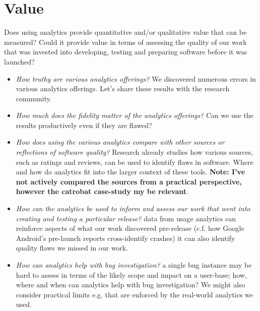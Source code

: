 \section{Value}
Does using analytics provide quantitative and/or qualitative value that can be measured? Could it provide value in terms of assessing the quality of our work that was invested into developing, testing and preparing software before it was launched?
\begin{itemize}
    \item \emph{How truthy are various analytics offerings?} We discovered numerous errors in various analytics offerings. Let's share these results with the research community.
    \item \emph{How much does the fidelity matter of the analytics offerings?} Can we use the results productively even if they are flawed?
    \item \emph{How does using the various analytics compare with other sources or reflections of software quality?} Research already studies how various sources, such as ratings and reviews, can be used to identify flaws in software. Where and how do analytics fit into the larger context of these tools. \textbf{Note: I've not actively compared the sources from a practical perspective, however the catrobat case-study my be relevant}.
    \item \emph{How can the analytics be used to inform and assess our work that went into creating and testing a particular release?} data from usage analytics can reinforce aspects of what our work discovered pre-release (c.f. how Google Android's pre-launch reports cross-identify crashes) it can also identify quality flaws we missed in our work.
    \item \emph{How can analytics help with bug investigation?} a single bug instance may be hard to assess in terms of the likely scope and impact on a user-base; how, where and when can analytics help with bug investigation? We might also consider practical limits e.g. that are enforced by the real-world analytics we used. 
\end{itemize}

